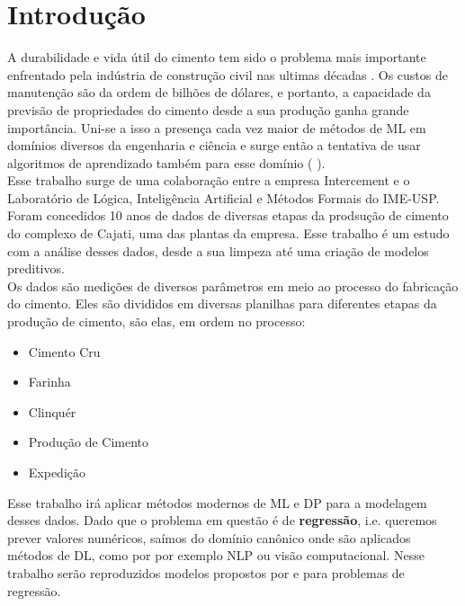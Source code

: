 \chapter{Introdução}
\label{cap:introducao}


A durabilidade e vida útil do cimento tem sido o problema mais importante enfrentado pela indústria de construção civil nas ultimas décadas \citep{cementml}. Os custos de manutenção são da ordem de bilhões de dólares, e portanto, a capacidade da previsão de propriedades do cimento desde a sua produção ganha grande importância. Uni-se a isso a presença cada vez maior de métodos de ML em domínios diversos da engenharia e ciência e surge então a tentativa de usar algoritmos de aprendizado também para esse domínio (\cite{cementnn1} \cite{cementnn2}). \\ 

Esse trabalho surge de uma colaboração entre a empresa Intercement e o Laboratório de Lógica, Inteligência Artificial e Métodos Formais do IME-USP. Foram concedidos 10 anos de dados de diversas etapas da prodsução de cimento do complexo de Cajati, uma das plantas da empresa. Esse trabalho é um estudo com a análise desses dados, desde a sua limpeza até uma criação de modelos preditivos. \\


Os dados são medições de diversos parâmetros em meio ao processo do fabricação do cimento. Eles são divididos em diversas planilhas para diferentes etapas da produção de cimento, são elas, em ordem no processo:

\begin{itemize}
        \item Cimento Cru
        \item Farinha
        \item Clinquér
        \item Produção de Cimento
        \item Expedição
\end{itemize}


Esse trabalho irá aplicar métodos modernos de ML e DP para a modelagem desses dados. Dado que o problema em questão é de \textbf{regressão}, i.e. queremos prever valores numéricos, saímos do domínio canônico onde são aplicados métodos de DL, como por por exemplo NLP ou visão computacional. Nesse trabalho serão reproduzidos modelos propostos por \citet{ubertime} e \citet{energylstm} para problemas de regressão.



